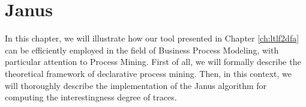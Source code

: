 \chapter{Janus}
In this chapter, we will illustrate how our tool \LTLfToDFA presented in Chapter \ref{ch:ltlf2dfa} can be efficiently employed in the field of Business Process Modeling, with particular attention to Process Mining. First of all, we will formally describe the theoretical framework of declarative process mining. Then, in this context, we will thoroughly describe the implementation of the Janus algorithm \citep{cecconi2018interestingness} for computing the interestingness degree of traces.